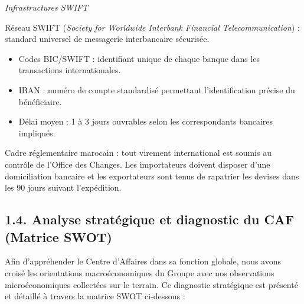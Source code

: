 \documentclass[12pt,a4paper]{report}
\begin{document}
\medskip\textit{Infrastructures SWIFT}

Réseau SWIFT (\textit{Society for Worldwide Interbank Financial Telecommunication}) : standard universel de messagerie interbancaire sécurisée.
\begin{itemize}
  \item Codes BIC/SWIFT : identifiant unique de chaque banque dans les transactions internationales.
  \item IBAN : numéro de compte standardisé permettant l'identification précise du bénéficiaire.
  \item Délai moyen : 1 à 3 jours ouvrables selon les correspondants bancaires impliqués.
\end{itemize}

Cadre réglementaire marocain : tout virement international est soumis au contrôle de l'Office des Changes. Les importateurs doivent disposer d'une domiciliation bancaire et les exportateurs sont tenus de rapatrier les devises dans les 90 jours suivant l'expédition.

\subsection*{1.4. Analyse stratégique et diagnostic du CAF (Matrice SWOT)}

Afin d'appréhender le Centre d'Affaires dans sa fonction globale, nous avons croisé les orientations macroéconomiques du Groupe avec nos observations microéconomiques collectées sur le terrain. Ce diagnostic stratégique est présenté et détaillé à travers la matrice SWOT ci-dessous :
\end{document}
